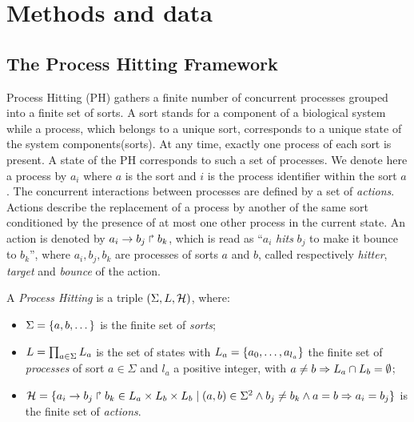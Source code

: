 \documentclass[11pt,a4paper,twoside]{epig}
\begin{document}
\vspace{3mm}
\noindent

\section{Methods and data}
\subsection{The Process  Hitting Framework}
\label{ssec:PH}



Process Hitting (PH) gathers a finite number of concurrent processes grouped into a finite set of sorts.
A sort stands for a component of a biological system while a process, which belongs to a unique sort, corresponds
to a unique state of the system components(sorts). At any time, exactly one process of each sort is present. A state of the 
PH corresponds to such a set of processes. We denote here a process by $a_i$ where $a$ 
is the sort and $i$ is the process identifier within the sort $a$.
The concurrent interactions between processes are defined by a set of \emph{actions}.
Actions describe the replacement of a process by another of the same sort conditioned by the presence 
of at most one other process in the current state. An action is denoted by $a_i\rightarrow b_j\Rsh b_k$, 
which is read as ``$a_i$ \emph{hits} $b_j$ to make it bounce to $b_k$'', where $a_i,b_j,b_k$ are 
processes of sorts $a$ and $b$, called respectively \emph{hitter}, \emph{target} and \emph{bounce} of 
the action.

\begin{definition}\label{def:PH}
A \emph{Process Hitting} is a triple $(\Sigma,L,\mathcal{H})$, where:
\begin{itemize}
\item $\Sigma = \{a,b,\dots\}$ is the finite set of \emph{sorts};
\item $L = \prod_{a\in\Sigma} L_a$ is the set of states with $L_a = \{a_0,\dots,a_{l_a}\}$
the finite set of \emph{processes} of sort $a\in\Sigma$ and $l_a$ a positive integer, with $a\neq b\Rightarrow L_a \cap L_b = \emptyset$;
\item $\mathcal{H} = \{ a_i\rightarrow b_j\Rsh b_k \in L_a \times L_b \times L_b \mid (a,b) \in \Sigma^2
  \wedge b_j\neq b_k \wedge a=b\Rightarrow a_i=b_j\}$ is the finite set of \emph{actions}.
\end{itemize}
\end{definition}
\end{document}
